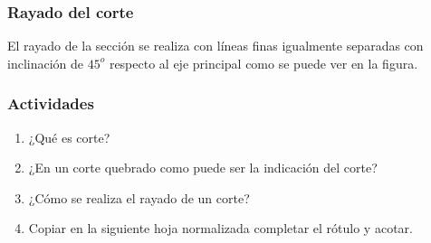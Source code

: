 \documentclass[../main]{subfiles}
\begin{document}
\subsubsection{Rayado del corte}

El rayado de la sección se realiza con líneas finas igualmente separadas con inclinación de $45^o$ respecto al eje principal como se puede ver en la figura.



\newpage
\subsubsection{Actividades}
\begin{enumerate}
    \item ¿Qué es corte?
    \item ¿En un corte quebrado como puede ser la indicación del corte?
    \item ¿Cómo se realiza el rayado de un corte?
    \item Copiar en la siguiente hoja normalizada completar el rótulo y acotar.
\end{enumerate}
\end{document}
